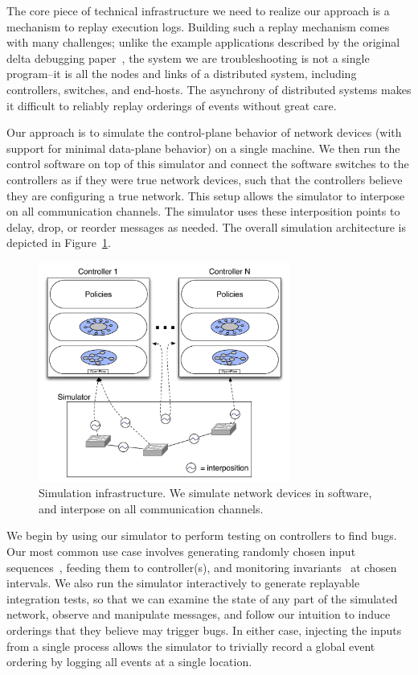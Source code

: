 The core piece of technical infrastructure we need to realize our approach is a
mechanism to replay execution logs. Building such a replay mechanism comes
with many challenges; unlike the example applications described
by the original delta debugging paper~\cite{Zeller:1999:YMP:318773.318946}, the system we are troubleshooting is not a
single program--it is all the nodes and links of a distributed system,
including controllers, switches, and end-hosts. The asynchrony of distributed
systems makes it difficult to reliably replay orderings of
events without great care.

Our approach is to simulate the control-plane
behavior of network devices (with support for minimal data-plane behavior) on
a single machine. We then run the control software on
top of this simulator and connect the software switches to the controllers as if they were true
network devices, such that the controllers believe they are configuring a true
network. This setup allows the simulator to interpose on all communication
channels. The simulator uses these interposition points to delay, drop, or reorder
messages as needed. The overall
simulation architecture is depicted in
Figure~\ref{fig:architecture}.

\begin{figure}[t]
    \includegraphics[width=3.25in]{../diagrams/architecture/Debugger_Architecture.pdf}
    \caption[]{\label{fig:architecture} Simulation infrastructure. We simulate
    network devices in software, and interpose on all communication
    channels.}
\end{figure}

We begin by using our simulator to perform testing on controllers to find
bugs. Our most common use case involves generating randomly chosen input
sequences~\cite{Miller:1990:ESR:96267.96279}, feeding them to controller(s),
and monitoring
invariants~\cite{hsa} at chosen intervals.
We also run the simulator interactively to generate replayable integration
tests, so that we can examine the state of any part of the simulated network,
observe and manipulate messages, and follow our
intuition to induce orderings that they believe may trigger bugs.
In either case, injecting the inputs from a single process
allows the simulator to trivially record a global event ordering
by logging all events at a single location.

